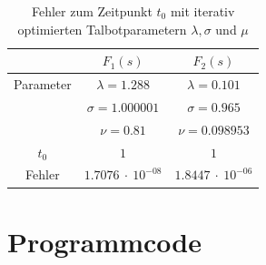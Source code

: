 \begin{table}
\centering
\begin{tabular}[c]{c|c|c}
& $F_{1}(s)$ & $F_{2}(s)$ \\
\hline
Parameter & $\lambda=1.288$ & $\lambda=0.101$ \\
 & $\sigma=1.000001$ & $\sigma=0.965$ \\
 & $\nu=0.81$ & $\nu=0.098953$ \\
\hline
$t_{0}$ & $1$ & $1$ \\
\hline
Fehler & $1.7076~\cdot~10^{-08}$ & $1.8447~\cdot~10^{-06}$ \\
\end{tabular}
\caption{Fehler zum Zeitpunkt $t_{0}$ mit iterativ optimierten Talbotparametern $\lambda, \sigma$ und $\mu$
\label{laplace:parametertabelle2}}
\end{table}


%
%
%
%
%
%

\FloatBarrier
\section{Programmcode}

